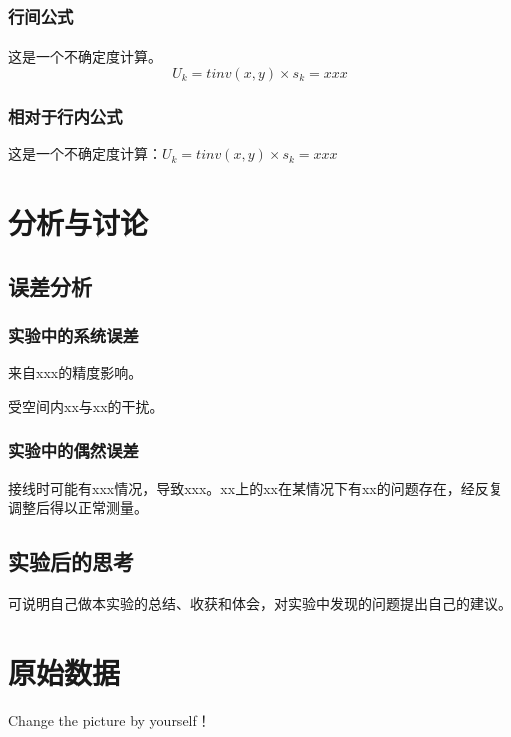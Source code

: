 \documentclass[UTF8]{ctexart}
\begin{document}
\subsubsection{行间公式}
\paragraph{}这是一个不确定度计算。
\[
U_k=tinv(x,y)×s_k=xxx
\]
\subsubsection{相对于行内公式}
这是一个不确定度计算：$U_k=tinv(x,y)×s_k=xxx$


\section{分析与讨论}

\subsection{误差分析}

\subsubsection{实验中的系统误差}
来自xxx的精度影响。

受空间内xx与xx的干扰。

\subsubsection{实验中的偶然误差}
接线时可能有xxx情况，导致xxx。xx上的xx在某情况下有xx的问题存在，经反复调整后得以正常测量。

\subsection{实验后的思考}
可说明自己做本实验的总结、收获和体会，对实验中发现的问题提出自己的建议。

\newpage
\section{原始数据}
\begin{center}
    Change the picture by yourself！
    
    
\end{center}




\end{document}
